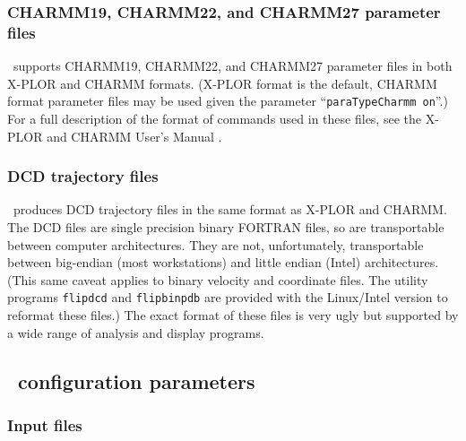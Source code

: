 \subsubsection{CHARMM19, CHARMM22, and CHARMM27 parameter files}

\NAMD\ supports CHARMM19, CHARMM22, and CHARMM27 parameter files in both
X-PLOR and CHARMM formats.
(X-PLOR format is the default, CHARMM format parameter files
may be used given the parameter ``{\tt paraTypeCharmm on}''.)
For a full description of the format of commands 
used in these files, see the X-PLOR and CHARMM User's Manual 
.  

\subsubsection{DCD trajectory files}

\NAMD\ produces DCD trajectory files in the same format as 
X-PLOR and CHARMM.  
The DCD files are single precision binary FORTRAN files, 
so are transportable between computer architectures.  
They are not, unfortunately, transportable between big-endian (most
workstations) and little endian (Intel) architectures.
(This same caveat applies to binary velocity and coordinate files.
The utility programs {\tt flipdcd} and {\tt flipbinpdb} are
provided with the Linux/Intel version to reformat these files.)
The exact format of these files is very ugly but supported by 
a wide range of analysis and display programs.  

\subsection{\NAMD\ configuration parameters}
\label{section:file_config}

\subsubsection{Input files}


